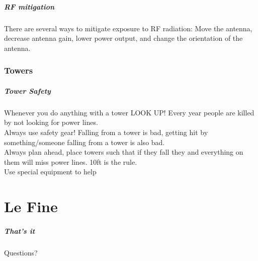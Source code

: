 \documentclass[10pt]{beamer}
\begin{document}
\begin{frame}
\frametitle{RF mitigation}
There are several ways to mitigate exposure to RF radiation: Move the antenna, decrease antenna gain, lower power output, and change the orientation of the antenna.
\end{frame}

\section{Towers}
\begin{frame}
\frametitle{Tower Safety}
Whenever you do anything with a tower LOOK UP! Every year people are killed by not looking for power lines.\\
Always use safety gear! Falling from a tower is bad, getting hit by something/someone falling from a tower is also bad.\\
Always plan ahead, place towers such that if they fall they and everything on them will miss power lines. 10ft is the rule.\\
Use special equipment to help
\end{frame}

\part{Le Fine}
\begin{frame}
\frametitle{That's it}
Questions?
\end{frame}
%
%
\end{document}
